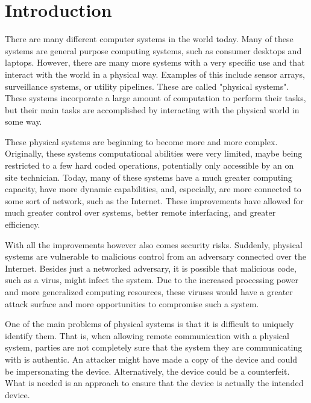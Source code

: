 %
%
%

\chapter{Introduction}
\label{chapter:intro}

There are many different computer systems in the world today. Many of these systems are general purpose computing
systems, such as consumer desktops and laptops. However, there are many more systems with a very specific use
and that interact with the world in a physical way. Examples of this include sensor arrays, surveillance systems,
or utility pipelines. These are called "physical systems".
These systems incorporate a large amount of computation to perform their tasks, but their main tasks 
are accomplished
by interacting with the physical world in some way. 

These physical systems are beginning to become more and more complex. Originally, these systems computational
abilities were very limited, maybe being restricted to a few hard coded operations, potentially only accessible by
an on site technician. Today, many of these systems have a much greater computing capacity, have more
dynamic capabilities, and, especially, are more connected to some sort of network, such as the Internet.
These improvements have allowed for much greater control over systems, better remote interfacing, and greater
efficiency.

With all the improvements however also comes security risks. Suddenly, physical systems are vulnerable to malicious
control from an adversary connected over the Internet. Besides just a networked adversary, it is possible that
malicious code, such as a virus, might infect the system. Due to the increased processing power and more 
generalized computing resources, these viruses would have a greater attack surface and more opportunities to
compromise such a system.

One of the main problems of physical systems is that it is difficult to uniquely identify them. That is,
when allowing remote communication with a physical system, parties are not completely sure that the 
system they are communicating
with is authentic. An attacker might have made a copy of the device and could be impersonating the device. 
Alternatively, the device could be a counterfeit. 
What is needed is an approach to ensure that the device is actually the intended device.

